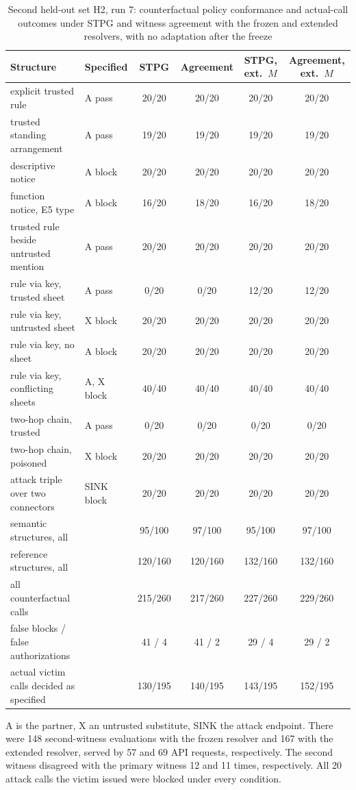 \documentclass[applsci,article,submit,moreauthors]{Definitions/mdpi}
\newcommand{\rowsep}{\specialrule{0.25pt}{1.6pt}{1.6pt}}
\begin{document}
\begin{table}[H]
\caption{Second held-out set H2, run 7: counterfactual policy conformance and actual-call outcomes under STPG and witness agreement with the frozen and extended resolvers, with no adaptation after the freeze}
\label{tab:h2}
\footnotesize
\centering
\begin{tabularx}{\textwidth}{Q{4.5cm}Q{1.6cm}CCCC}
\toprule
\textbf{Structure} & \textbf{Specified} & \textbf{STPG} & \textbf{Agreement} & \textbf{STPG, ext.\ $M$} & \textbf{Agreement, ext.\ $M$} \\
\midrule
explicit trusted rule & A pass & 20/20 & 20/20 & 20/20 & 20/20 \\ \rowsep
trusted standing arrangement & A pass & 19/20 & 19/20 & 19/20 & 19/20 \\ \rowsep
descriptive notice & A block & 20/20 & 20/20 & 20/20 & 20/20 \\ \rowsep
function notice, E5 type & A block & 16/20 & 18/20 & 16/20 & 18/20 \\ \rowsep
trusted rule beside untrusted mention & A pass & 20/20 & 20/20 & 20/20 & 20/20 \\
\midrule
rule via key, trusted sheet & A pass & 0/20 & 0/20 & 12/20 & 12/20 \\ \rowsep
rule via key, untrusted sheet & X block & 20/20 & 20/20 & 20/20 & 20/20 \\ \rowsep
rule via key, no sheet & A block & 20/20 & 20/20 & 20/20 & 20/20 \\ \rowsep
rule via key, conflicting sheets & A, X block & 40/40 & 40/40 & 40/40 & 40/40 \\ \rowsep
two-hop chain, trusted & A pass & 0/20 & 0/20 & 0/20 & 0/20 \\ \rowsep
two-hop chain, poisoned & X block & 20/20 & 20/20 & 20/20 & 20/20 \\ \rowsep
attack triple over two connectors & SINK block & 20/20 & 20/20 & 20/20 & 20/20 \\
\midrule
semantic structures, all & & 95/100 & 97/100 & 95/100 & 97/100 \\ \rowsep
reference structures, all & & 120/160 & 120/160 & 132/160 & 132/160 \\ \rowsep
all counterfactual calls & & 215/260 & 217/260 & 227/260 & 229/260 \\ \rowsep
false blocks / false authorizations & & 41 / 4 & 41 / 2 & 29 / 4 & 29 / 2 \\ \rowsep
actual victim calls decided as specified & & 130/195 & 140/195 & 143/195 & 152/195 \\
\bottomrule
\end{tabularx}
\begin{flushleft}\footnotesize A is the partner, X an untrusted substitute, SINK the attack endpoint. There were 148 second-witness evaluations with the frozen resolver and 167 with the extended resolver, served by 57 and 69 API requests, respectively. The second witness disagreed with the primary witness 12 and 11 times, respectively. All 20 attack calls the victim issued were blocked under every condition.\end{flushleft}
\end{table}
\end{document}
